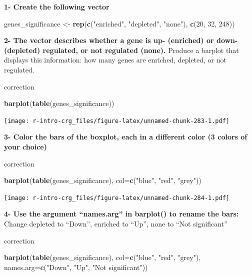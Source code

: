 \documentclass[]{book}
\newenvironment{Shaded}{\begin{snugshade}}{\end{snugshade}}
\newcommand{\DataTypeTok}[1]{\textcolor[rgb]{0.13,0.29,0.53}{#1}}
\newcommand{\DecValTok}[1]{\textcolor[rgb]{0.00,0.00,0.81}{#1}}
\newcommand{\KeywordTok}[1]{\textcolor[rgb]{0.13,0.29,0.53}{\textbf{#1}}}
\newcommand{\NormalTok}[1]{#1}
\newcommand{\StringTok}[1]{\textcolor[rgb]{0.31,0.60,0.02}{#1}}
\begin{document}
\textbf{1- Create the following vector}

\begin{Shaded}
\begin{Highlighting}[]
\NormalTok{genes_significance <-}\StringTok{ }\KeywordTok{rep}\NormalTok{(}\KeywordTok{c}\NormalTok{(}\StringTok{"enriched"}\NormalTok{, }\StringTok{"depleted"}\NormalTok{, }\StringTok{"none"}\NormalTok{), }\KeywordTok{c}\NormalTok{(}\DecValTok{20}\NormalTok{, }\DecValTok{32}\NormalTok{, }\DecValTok{248}\NormalTok{))}
\end{Highlighting}
\end{Shaded}

\textbf{2- The vector describes whether a gene is up- (enriched) or down- (depleted) regulated, or not regulated (none).}
Produce a barplot that displays this information: how many genes are enriched, depleted, or not regulated.

correction

\begin{Shaded}
\begin{Highlighting}[]
\KeywordTok{barplot}\NormalTok{(}\KeywordTok{table}\NormalTok{(genes_significance))}
\end{Highlighting}
\end{Shaded}

\texttt{[image: r-intro-crg\_files/figure-latex/unnamed-chunk-283-1.pdf]}

\textbf{3- Color the bars of the boxplot, each in a different color (3 colors of your choice)}

correction

\begin{Shaded}
\begin{Highlighting}[]
\KeywordTok{barplot}\NormalTok{(}\KeywordTok{table}\NormalTok{(genes_significance), }
  \DataTypeTok{col=}\KeywordTok{c}\NormalTok{(}\StringTok{"blue"}\NormalTok{, }\StringTok{"red"}\NormalTok{, }\StringTok{"grey"}\NormalTok{))}
\end{Highlighting}
\end{Shaded}

\texttt{[image: r-intro-crg\_files/figure-latex/unnamed-chunk-284-1.pdf]}

\textbf{4- Use the argument ``names.arg'' in barplot() to rename the bars:}
Change depleted to ``Down'', enriched to ``Up'', none to ``Not significant''

correction

\begin{Shaded}
\begin{Highlighting}[]
\KeywordTok{barplot}\NormalTok{(}\KeywordTok{table}\NormalTok{(genes_significance), }
  \DataTypeTok{col=}\KeywordTok{c}\NormalTok{(}\StringTok{"blue"}\NormalTok{, }\StringTok{"red"}\NormalTok{, }\StringTok{"grey"}\NormalTok{), }
  \DataTypeTok{names.arg=}\KeywordTok{c}\NormalTok{(}\StringTok{"Down"}\NormalTok{, }\StringTok{"Up"}\NormalTok{, }\StringTok{"Not significant"}\NormalTok{))}
\end{Highlighting}
\end{Shaded}
\end{document}
